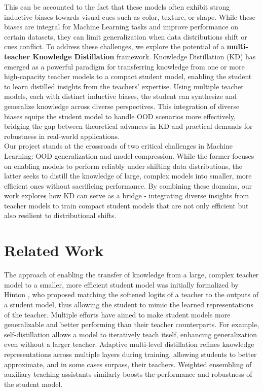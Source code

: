 \documentclass{article}
\begin{document}
This can be accounted to the fact that these models often exhibit strong inductive biases towards visual cues such as color, texture, or shape. While these biases are integral for Machine Learning tasks and improve performance on certain datasets, they can limit generalization when data distributions shift or cues conflict. To address these challenges, we explore the potential of a \textbf{multi-teacher Knowledge Distillation} framework. Knowledge Distillation (KD) has emerged as a powerful paradigm for transferring knowledge from one or more high-capacity teacher models to a compact student model, enabling the student to learn distilled insights from the teachers' expertise. Using multiple teacher models, each with distinct inductive biases, the student can synthesize and generalize knowledge across diverse perspectives. This integration of diverse biases equips the student model to handle OOD scenarios more effectively, bridging the gap between theoretical advances in KD and practical demands for robustness in real-world applications. \\

Our project stands at the crossroads of two critical challenges in Machine Learning: OOD generalization and model compression. While the former focuses on enabling models to perform reliably under shifting data distributions, the latter seeks to distill the knowledge of large, complex models into smaller, more efficient ones without sacrificing performance. By combining these domains, our work explores how KD can serve as a bridge - integrating diverse insights from teacher models to train compact student models that are not only efficient but also resilient to distributional shifts.

\section{Related Work}

The approach of enabling the transfer of knowledge from a large, complex teacher model to a smaller, more efficient student model was initially formalized by Hinton \cite{hinton2015distilling}, who proposed matching the softened logits of a teacher to the outputs of a student model, thus allowing the student to mimic the learned representations of the teacher. Multiple efforts have aimed to make student models more generalizable and better performing than their teacher counterparts. For example, self-distillation \cite{furlanello2018born} allows a model to iteratively teach itself, enhancing generalization even without a larger teacher. Adaptive multi-level distillation \cite{liu2020adaptive} refines knowledge representations across multiple layers during training, allowing students to better approximate, and in some cases surpass, their teachers. Weighted ensembling of auxiliary teaching assistants \cite{prasad2022knowledge} similarly boosts the performance and robustness of the student model. \\
\end{document}
